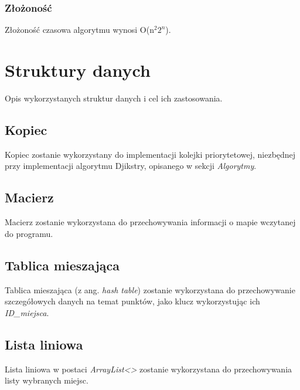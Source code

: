 \documentclass{article}
\begin{document}
\subsubsection{Złożoność}
    Złożoność czasowa algorytmu wynosi O(n$^{2}2^{n}$).


\section{Struktury danych}
Opis wykorzystanych struktur danych i cel ich zastosowania.

\subsection{Kopiec}
    Kopiec zostanie wykorzystany do implementacji kolejki priorytetowej, niezbędnej przy implementacji algorytmu Djikstry, opisanego w sekcji \textit{Algorytmy}.
    
\subsection{Macierz}
    Macierz zostanie wykorzystana do przechowywania informacji o mapie wczytanej do programu.
    
\subsection{Tablica mieszająca}
    Tablica mieszająca (z ang. \textit{hash table}) zostanie wykorzystana do przechowywanie szczegółowych danych na temat punktów, jako klucz wykorzystując ich \textit{ID\_miejsca}.

\subsection{Lista liniowa}
    Lista liniowa w postaci \textit{ArrayList<>} zostanie wykorzystana do przechowywania listy wybranych miejsc.
\end{document}
